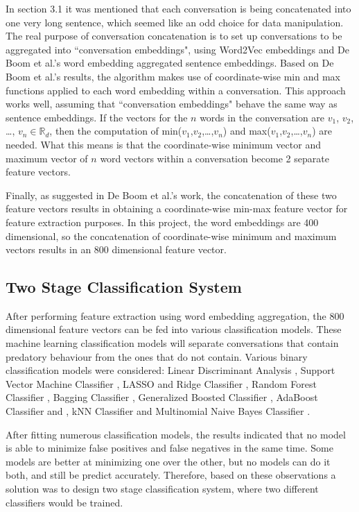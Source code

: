 \documentclass[11pt]{article}
\newcommand{\R}{\mathbb{R}}
\begin{document}
In section 3.1 it was mentioned that each conversation is being concatenated into one very long sentence, which seemed like an odd choice for data manipulation. The real purpose of conversation concatenation is to set up conversations to be aggregated into ``conversation embeddings", using Word2Vec embeddings and De Boom et al.'s word embedding aggregated sentence embeddings. 
Based on De Boom et al.'s results, the algorithm makes use of coordinate-wise min and max functions applied to each word embedding within a conversation. This approach works well, assuming that ``conversation embeddings" behave the same way as sentence embeddings. If the vectors for the $n$ words in the conversation are $v_1$, $v_2$, \dots, $v_n \in \R_{d}$, then the computation of min($v_1$,$v_2$,\dots,$v_n$) and max($v_1$,$v_2$,\dots,$v_n$) are needed. What this means is that the coordinate-wise minimum vector and maximum vector of $n$ word vectors within a conversation become 2 separate feature vectors. 

Finally, as suggested in De Boom et al.'s work, the concatenation of these two feature vectors results in obtaining a coordinate-wise min-max feature vector for feature extraction purposes. In this project, the word embeddings are 400 dimensional, so the concatenation of coordinate-wise minimum and maximum vectors results in an 800 dimensional feature vector.

\subsection{Two Stage Classification System}
After performing feature extraction using word embedding aggregation, the 800 dimensional feature vectors can be fed into various classification models. These machine learning classification models will separate conversations that contain predatory behaviour from the ones that do not contain. Various binary classification models were considered: Linear Discriminant Analysis \cite{ripley2007pattern}, Support Vector Machine Classifier \cite{fan2008liblinear}, LASSO and Ridge Classifier \cite{friedman2010regularization}, Random Forest Classifier \cite{breiman2001random}, Bagging Classifier \cite{breiman1996bagging}, Generalized Boosted Classifier \cite{ridgeway2006gbm}, AdaBoost Classifier \cite{freund1996experiments} and \cite{hastie2009multi}, kNN Classifier \cite{ripley2007pattern} and Multinomial Naive Bayes Classifier \cite{mccallum1998comparison}. 

After fitting numerous classification models, the results indicated that no model is able to minimize false positives and false negatives in the same time. Some models are better at minimizing one over the other, but no models can do it both, and still be predict accurately. Therefore, based on these observations a solution was to design two stage classification system, where two different classifiers would be trained.
\end{document}
